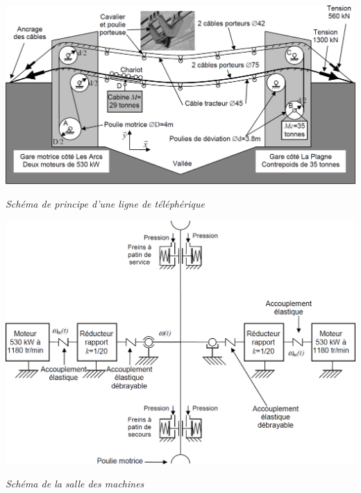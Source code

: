 \documentclass[10pt]{article}
\begin{document}
\begin{minipage}[c]{.49\linewidth}
\begin{center}
\includegraphics[width=\textwidth]{images/Schema_01}

\textit{Schéma de principe d'une ligne de téléphérique}
\end{center}
\end{minipage} \hfill
\begin{minipage}[c]{.49\linewidth}
\begin{center}
\includegraphics[width=\textwidth]{images/Schema_02}

\textit{Schéma de la salle des machines}
\end{center}
\end{minipage}
\vspace{.25cm}

\fi
\end{document}
